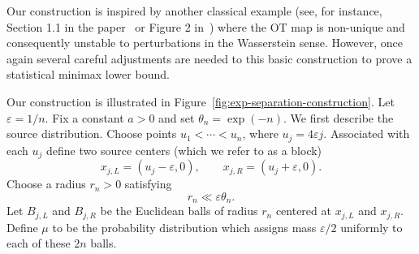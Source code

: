 \documentclass[11pt,twoside]{article}
\begin{document}
Our construction is inspired by another classical example (see, for instance, Section 1.1 in the paper~\cite{letrouit2025lectures} or Figure 2 in~\cite{letrouit2026unstable}) where the OT map is non-unique and consequently unstable to perturbations in the Wasserstein sense. However, once again several careful adjustments are needed to this basic construction to prove a statistical minimax lower bound. 

Our construction is illustrated in Figure~\ref{fig:exp-separation-construction}. Let  $\varepsilon=1/n$. Fix a constant $a>0$ and set $\theta_n = \exp(-n)$. We first describe the source distribution. 
Choose points $u_1<\cdots<u_n$, where $u_j = 4\varepsilon j$. 
Associated with each $u_j$ define two source centers (which we refer to as a block)
\[
x_{j,L}=(u_j-\varepsilon,0),
\qquad
x_{j,R}=(u_j+\varepsilon,0).
\]
Choose a radius $r_n>0$ satisfying
\[
r_n \ll  \varepsilon \theta_n .
\]
Let $B_{j,L}$ and $B_{j,R}$ be the Euclidean balls of radius $r_n$
centered at $x_{j,L}$ and $x_{j,R}$. Define $\mu$ to be the probability
distribution which assigns mass $\varepsilon/2$ uniformly to each of these $2n$
balls.
\end{document}
